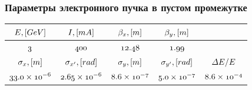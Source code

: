 \documentclass[14pt, hyperref = {colorlinks}]{beamer}
\begin{document}
\begin{frame}
\frametitle{Параметры электронного пучка в пустом промежутке}\label{t1}
\begin{table}[h]
	
	\begin{tabular}{c|c|c|c|c}
		\hline
		\hline
		\rule{0pt}{3ex}   $\mathnormal{E, [GeV]}$ & $\mathnormal{I, [mA]}$ & $\mathnormal{\beta_x, [m]}$ & $\mathnormal{\beta_{y}, [m]}$&\\ \hline
		\rule{0pt}{3ex}   $\mathnormal{3}$		 & $\mathnormal{400}    $ & $\mathnormal{12.48}$        & $\mathnormal{1.99}$  &   \\ \hline
		\hline	
		\rule{0pt}{3ex}   $\mathnormal{\sigma_x, [m]}$ & $\mathnormal{\sigma_{x'}, [rad]}$ & $\mathnormal{\sigma_y, [m]}$     & $\mathnormal{\sigma_{y'}, [rad]}$ & $\mathnormal{\Delta E / E}$      \\ \hline
		\rule{0pt}{3ex}   $\mathnormal{33.0 \times 10^{-6}}$  & $\mathnormal{2.65 \times 10^{-6}}$  &  $\mathnormal{8.6 \times 10^{-7}}$ & $\mathnormal{5.0 \times 10^{-7}}$   & $\mathnormal{8.6 \times 10^{-4}}$ \\
		\hline\hline
	\end{tabular}
\end{table}
\end{frame}
\end{document}
